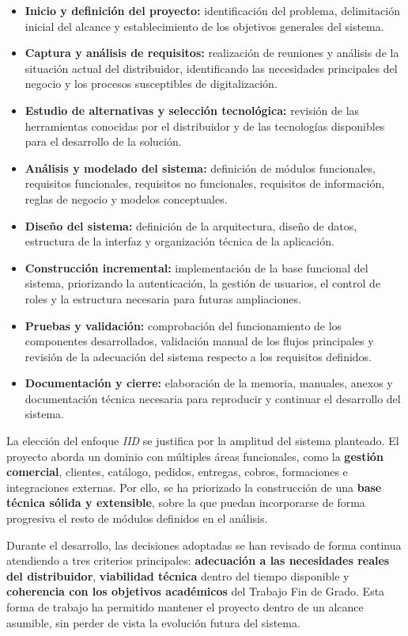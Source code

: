 \begin{itemize}
    \item \textbf{Inicio y definición del proyecto:} identificación del problema, delimitación inicial del alcance y establecimiento de los objetivos generales del sistema.
    \item \textbf{Captura y análisis de requisitos:} realización de reuniones y análisis de la situación actual del distribuidor, identificando las necesidades principales del negocio y los procesos susceptibles de digitalización.
    \item \textbf{Estudio de alternativas y selección tecnológica:} revisión de las herramientas conocidas por el distribuidor y de las tecnologías disponibles para el desarrollo de la solución.
    \item \textbf{Análisis y modelado del sistema:} definición de módulos funcionales, requisitos funcionales, requisitos no funcionales, requisitos de información, reglas de negocio y modelos conceptuales.
    \item \textbf{Diseño del sistema:} definición de la arquitectura, diseño de datos, estructura de la interfaz y organización técnica de la aplicación.
    \item \textbf{Construcción incremental:} implementación de la base funcional del sistema, priorizando la autenticación, la gestión de usuarios, el control de roles y la estructura necesaria para futuras ampliaciones.
    \item \textbf{Pruebas y validación:} comprobación del funcionamiento de los componentes desarrollados, validación manual de los flujos principales y revisión de la adecuación del sistema respecto a los requisitos definidos.
    \item \textbf{Documentación y cierre:} elaboración de la memoria, manuales, anexos y documentación técnica necesaria para reproducir y continuar el desarrollo del sistema.
\end{itemize}

La elección del enfoque \textit{IID} se justifica por la amplitud del sistema planteado. El proyecto aborda un dominio con múltiples áreas funcionales, como la \textbf{gestión comercial}, clientes, catálogo, pedidos, entregas, cobros, formaciones e integraciones externas. Por ello, se ha priorizado la construcción de una \textbf{base técnica sólida y extensible}, sobre la que puedan incorporarse de forma progresiva el resto de módulos definidos en el análisis.

Durante el desarrollo, las decisiones adoptadas se han revisado de forma continua atendiendo a tres criterios principales: \textbf{adecuación a las necesidades reales del distribuidor}, \textbf{viabilidad técnica} dentro del tiempo disponible y \textbf{coherencia con los objetivos académicos} del Trabajo Fin de Grado. Esta forma de trabajo ha permitido mantener el proyecto dentro de un alcance asumible, sin perder de vista la evolución futura del sistema.

